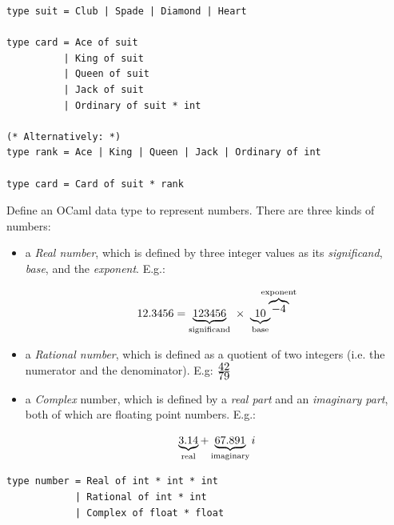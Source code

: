 \documentclass[addpoints]{exam}
\begin{document}
\begin{questions}
  \begin{solutionbox}{6.5cm}
    \begin{verbatim}
type suit = Club | Spade | Diamond | Heart

type card = Ace of suit
          | King of suit
          | Queen of suit
          | Jack of suit
          | Ordinary of suit * int

(* Alternatively: *)
type rank = Ace | King | Queen | Jack | Ordinary of int

type card = Card of suit * rank
    \end{verbatim}
  \end{solutionbox}

  
  \question
  Define an OCaml data type to represent numbers.
  There are three kinds of numbers:
  \begin{itemize}
  \item a \emph{Real number}, which is defined by three integer values as its
    \emph{significand}, \emph{base}, and the \emph{exponent}.
    E.g.:

    $$12.3456 = \underbrace{123456}_\textrm{\scriptsize significand}~\times~\underbrace{10}_\textrm{\scriptsize base}\!\!\!\!\!\!^{\overbrace{-4}^\textrm{\scriptsize exponent}}$$
    
  \item a \emph{Rational number}, which is defined as a quotient of two integers
    (i.e. the numerator and the denominator).
    E.g: $\frac{\textrm{\normalsize 42}}{\textrm{\normalsize 79}}$
    
  \item a \emph{Complex} number, which is defined by a \emph{real part} and an \emph{imaginary part},
    both of which are floating point numbers. E.g.:

    $$ \underbrace{3.14}_\textrm{\scriptsize real} + \underbrace{67.891}_\textrm{\scriptsize imaginary} i$$
    
  \end{itemize}
  
  \begin{solutionbox}{2.5cm}
    \begin{verbatim}
type number = Real of int * int * int
            | Rational of int * int
            | Complex of float * float
    \end{verbatim}
  \end{solutionbox}

  
  \vspace{1em}
  \vspace{1em}


\end{questions}
\end{document}

